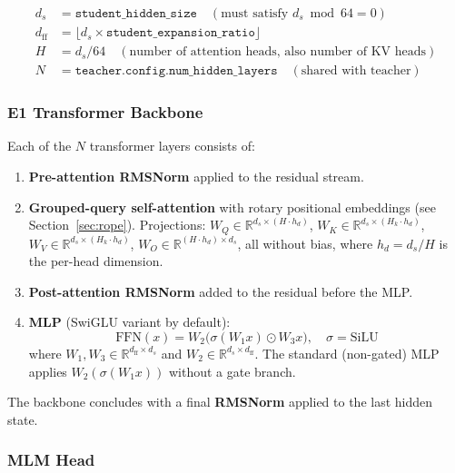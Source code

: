\documentclass[11pt,a4paper]{article}
\begin{document}
\begin{align*}
  d_s &= \texttt{student\_hidden\_size} \quad (\text{must satisfy } d_s \bmod 64 = 0) \\
  d_{\mathrm{ff}} &= \lfloor d_s \times \texttt{student\_expansion\_ratio} \rfloor \\
  H   &= d_s / 64 \quad (\text{number of attention heads, also number of KV heads})\\
  N   &= \texttt{teacher.config.num\_hidden\_layers} \quad (\text{shared with teacher})
\end{align*}

\subsubsection{E1 Transformer Backbone}

Each of the $N$ transformer layers consists of:

\begin{enumerate}
  \item \textbf{Pre-attention RMSNorm} applied to the residual stream.
  \item \textbf{Grouped-query self-attention} with rotary positional embeddings (see
        Section~\ref{sec:rope}).  Projections: $W_Q \in \mathbb{R}^{d_s \times (H \cdot h_d)}$,
        $W_K \in \mathbb{R}^{d_s \times (H_k \cdot h_d)}$,
        $W_V \in \mathbb{R}^{d_s \times (H_k \cdot h_d)}$,
        $W_O \in \mathbb{R}^{(H \cdot h_d) \times d_s}$, all without bias, where
        $h_d = d_s / H$ is the per-head dimension.
  \item \textbf{Post-attention RMSNorm} added to the residual before the MLP.
  \item \textbf{MLP} (SwiGLU variant by default):
        \begin{equation}
          \mathrm{FFN}(x) = W_2\!\bigl(\sigma(W_1 x) \odot W_3 x\bigr), \quad \sigma = \mathrm{SiLU}
        \end{equation}
        where $W_1, W_3 \in \mathbb{R}^{d_{\mathrm{ff}} \times d_s}$ and
        $W_2 \in \mathbb{R}^{d_s \times d_{\mathrm{ff}}}$.
        The standard (non-gated) MLP applies $W_2(\sigma(W_1 x))$ without a gate branch.
\end{enumerate}

The backbone concludes with a final \textbf{RMSNorm} applied to the last hidden state.

\subsubsection{MLM Head}
\end{document}
